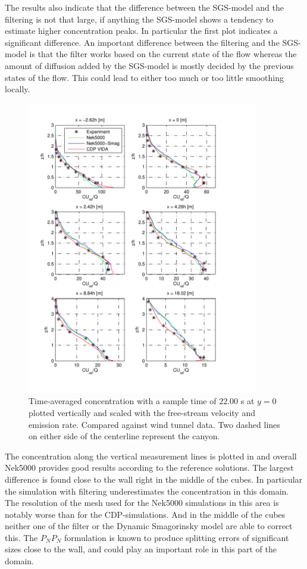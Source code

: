 The results also indicate that the difference between the SGS-model and the filtering
is not that large,
if anything the SGS-model shows a tendency to estimate higher concentration peaks.
In particular the first plot indicates a significant difference.
An important difference between the filtering and the SGS-model is 
that the filter works based on the current state of the flow 
whereas the amount of diffusion added by the SGS-model is mostly decided
by the previous states of the flow.
This could lead to either too much or too little smoothing locally.

\newpage
\begin{figure}[h]
    \centering
    \includegraphics[width=0.9\textwidth]{Figures/NekcV_all.pdf}
    \caption{Time-averaged concentration with a sample time of $22.00$ s at $y = 0$ plotted
    vertically and scaled 
    with the free-stream velocity and emission rate. Compared against wind tunnel data.
Two dashed lines on either side of the centerline represent the canyon.}
    \label{fig:cVall}
\end{figure}
The concentration along the vertical measurement lines is plotted in  and overall 
Nek5000 provides good results according to the reference solutions. The largest difference is found close 
to the wall right in the middle of the cubes. In particular the simulation with filtering 
underestimates the concentration in this domain. The resolution of the mesh used for the 
Nek5000 simulations in this area is notably worse than for the CDP-simulations.
And in the middle of the cubes neither one of the filter or the Dynamic Smagorinsky model
are able to correct this.
The $P_NP_N$ formulation is known to produce splitting errors of significant sizes 
close to the wall, and could play an important role in this part of the domain.

